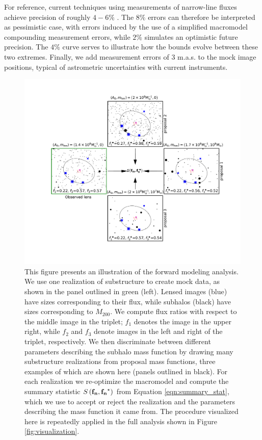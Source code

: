 For reference, current techniques using measurements of narrow-line fluxes achieve precision of roughly $4-6\%$ \citep{Nierenberg++14,Nierenberg++17}. The $8\%$ errors can therefore be interpreted as pessimistic case, with errors induced by the use of a simplified macromodel compounding measurement errors, while $2\%$ simulates an optimistic future precision. The $4\%$ curve serves to illustrate how the bounds evolve between these two extremes. Finally, we add measurement errors of 3 m.a.s. to the mock image positions, typical of astrometric uncertainties with current instruments.
\begin{figure}
	\centering
	\includegraphics[clip,trim=4cm 3.2cm 3cm
	2.7cm,width=.75\textwidth,keepaspectratio]{./figures_ABCforward/schematic.pdf}
	\caption[Schematic summary of forward model]{\label{fig:visualization2} This figure presents an illustration of the forward modeling analysis.  We use one realization of substructure to create mock data, as shown in the panel outlined in green (left). Lensed images (blue) have sizes corresponding to their flux, while subhalos (black) have sizes corresponding to $M_{200}$.  We compute flux ratios with respect to the middle image in the triplet; $f_1$ denotes the image in the upper right, while $f_2$ and $f_3$ denote images in the left and right of the triplet, respectively. We then discriminate between different parameters describing the subhalo mass function by drawing many substructure realizations from proposal mass functions, three examples of which are shown here (panels outlined in black). For each realization we re-optimize the macromodel and compute the summary statistic $S\left({\bf{f_n}},{\bf{f_n}^{\star}}\right)$ from Equation \ref{eqn:summary_stat}, which we use to accept or reject the realization and the parameters describing the mass function it came from. The procedure visualized here is repeatedly applied in the full analysis shown in Figure \ref{fig:visualization}. 
	}
\end{figure}
